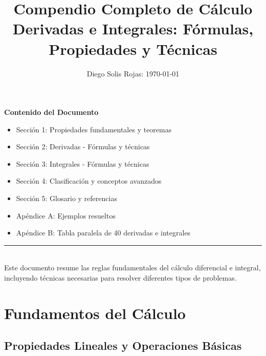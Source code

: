 \documentclass{article}
\title{\Huge\textbf{\textcolor{titlecolor}{Compendio Completo de Cálculo}}\\
\Large Derivadas e Integrales: Fórmulas, Propiedades y Técnicas}
\author{
\small Diego Solis Rojas: \today}
\date{}
\begin{document}
\begin{titlepage}
    \maketitle
    \centering
    \vspace{2cm}
    
    \begin{infobox}[
        width=0.8\textwidth,
        center,
        fontupper=\large
    ]
        \centering
        \textbf{Contenido del Documento}\\[0.5em]
        \begin{minipage}{0.9\textwidth}
            \begin{itemize}
                \item Sección 1: Propiedades fundamentales y teoremas
                \item Sección 2: Derivadas - Fórmulas y técnicas
                \item Sección 3: Integrales - Fórmulas y técnicas
                \item Sección 4: Clasificación y conceptos avanzados
                \item Sección 5: Glosario y referencias
                \item Apéndice A: Ejemplos resueltos
                \item Apéndice B: Tabla paralela de 40 derivadas e integrales
            \end{itemize}
        \end{minipage}
    \end{infobox}
    
    \vfill
    \rule{0.8\textwidth}{0.4pt}\\[0.5em]
    \small Este documento resume las reglas fundamentales del cálculo diferencial e integral,\\
    incluyendo técnicas necesarias para resolver diferentes tipos de problemas.
\end{titlepage}

\tableofcontents
\newpage

\section{Fundamentos del Cálculo}

\subsection{Propiedades Lineales y Operaciones Básicas}
\end{document}

